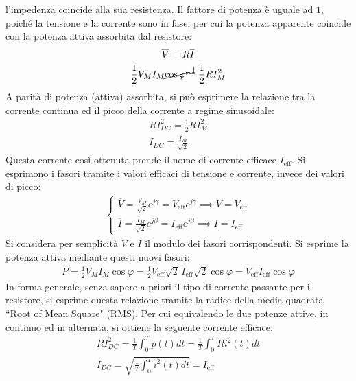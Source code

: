 \documentclass{article}
\numberwithin{equation}{subsection}
\begin{document}
l'impedenza coincide alla sua resistenza. Il fattore di potenza è uguale ad $1$, poiché la tensione e la corrente sono in fase, per cui la potenza apparente coincide con la 
potenza attiva assorbita dal resistore:
\begin{gather*}
    \overline{V}=R\overline{I}\\
    \displaystyle\frac{1}{2}V_MI_M\cancelto{1}{\cos\varphi}=\frac{1}{2}RI_M^2
\end{gather*}
A parità di potenza (attiva) assorbita, si può esprimere la relazione tra la corrente continua ed il picco della corrente a regime sinusoidale:
\begin{gather*}
    RI_{DC}^2=\displaystyle\frac{1}{2}RI_M^2\\
    I_{DC}=\displaystyle\frac{I_M}{\sqrt{2}}
\end{gather*}
Questa corrente così ottenuta prende il nome di corrente efficace $I_{\mbox{eff}}$. 
Si esprimono i fasori tramite i valori efficaci di tensione e corrente, invece dei valori di picco:
\begin{gather*}
    \begin{cases}
        \overline{V}=\displaystyle\frac{V_{M}}{\sqrt{2}}e^{j\gamma}=V_{\mbox{eff}}e^{j\gamma}\implies V=V_{\mbox{eff}}\\
        \overline{I}=\displaystyle\frac{I_{M}}{\sqrt{2}}e^{j\beta}=I_{\mbox{eff}}e^{j\beta}\implies I=I_{\mbox{eff}}
    \end{cases}
\end{gather*}
Si considera per semplicità $V$ e $I$ il modulo dei fasori corrispondenti. 
Si esprime la potenza attiva mediante questi nuovi fasori: 
\begin{gather*}
    P=\displaystyle\frac{1}{2}V_MI_M\cos\varphi=\frac{1}{2}V_{\mbox{eff}}\sqrt{2}\,I_{\mbox{eff}}\sqrt{2}\cos\varphi=V_{\mbox{eff}}I_{\mbox{eff}}\cos\varphi
\end{gather*}
In forma generale, senza sapere a priori il tipo di corrente passante per il resistore, si esprime questa relazione tramite la radice 
della media quadrata ``Root of Mean Square" (RMS). Per cui equivalendo le due potenze attive, in continuo ed in alternata, si ottiene la seguente corrente efficace: 
\begin{gather*}
    RI_{DC}^2=\displaystyle\frac{1}{T}\int_0^Tp(t)dt=\frac{1}{T}\int_0^TRi^2(t)dt\\
    I_{DC}=\displaystyle\sqrt{\frac{1}{T}\int_0^Ti^2(t)dt}=I_{\mbox{eff}}
\end{gather*}
\end{document}
